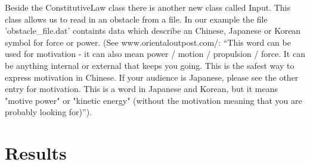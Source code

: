 \documentclass{article}
\begin{document}
Beside the ConstitutiveLaw class there is another new class called Input. This
class allows us to read in an obstacle from a file. In our example the file
'obstacle\_file.dat' containts data which describe an Chinese, Japanese or
Korean symbol for force or power. (See www.orientaloutpost.com/: ``This word can be used for motivation - it
can also mean power / motion / propulsion / force. It can be anything
internal or external that keeps you going. This is the safest way to express
motivation in Chinese. If your audience is Japanese, please see the other entry
for motivation. This is a word in Japanese and Korean, but it means "motive
power" or "kinetic energy" (without the motivation meaning that you are
probably looking for)'').

\section{Results}
\end{document}

